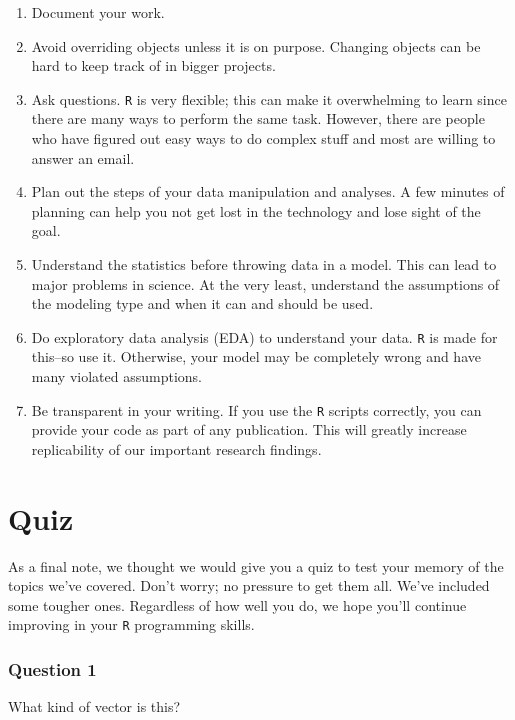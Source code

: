 \documentclass[]{tufte-book}
\providecommand{\tightlist}{%
  \setlength{\itemsep}{0pt}\setlength{\parskip}{0pt}}
\theoremstyle{definition}
\theoremstyle{definition}
\theoremstyle{remark}
\begin{document}
\begin{enumerate}
\def\labelenumi{\arabic{enumi}.}
\tightlist
\item
  Document your work.
\item
  Avoid overriding objects unless it is on purpose. Changing objects can
  be hard to keep track of in bigger projects.
\item
  Ask questions. \texttt{R} is very flexible; this can make it
  overwhelming to learn since there are many ways to perform the same
  task. However, there are people who have figured out easy ways to do
  complex stuff and most are willing to answer an email.
\item
  Plan out the steps of your data manipulation and analyses. A few
  minutes of planning can help you not get lost in the technology and
  lose sight of the goal.
\item
  Understand the statistics before throwing data in a model. This can
  lead to major problems in science. At the very least, understand the
  assumptions of the modeling type and when it can and should be used.
\item
  Do exploratory data analysis (EDA) to understand your data. \texttt{R}
  is made for this--so use it. Otherwise, your model may be completely
  wrong and have many violated assumptions.
\item
  Be transparent in your writing. If you use the \texttt{R} scripts
  correctly, you can provide your code as part of any publication. This
  will greatly increase replicability of our important research
  findings.
\end{enumerate}

\section*{Quiz}\label{quiz}

As a final note, we thought we would give you a quiz to test your memory
of the topics we've covered. Don't worry; no pressure to get them all.
We've included some tougher ones. Regardless of how well you do, we hope
you'll continue improving in your \texttt{R} programming skills.

\subsubsection*{Question 1}\label{question-1}

What kind of vector is this?
\end{document}
